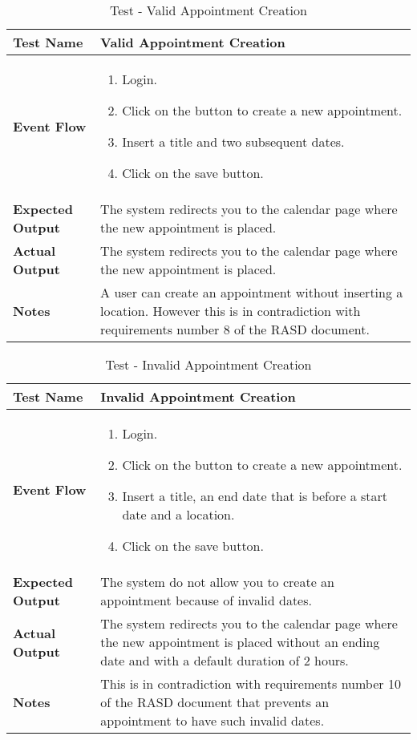 \begin{table}[h]	
\centering
\def\arraystretch{1.5}
\begin{tabular}{|m{7cm}|m{7cm}|}
	\hline
	\textbf{Test Name}            & Valid Appointment Creation   \\ \hline
	\textbf{Event Flow}             & 
	 	\begin{enumerate}
	 	\item Login.
	 	\item Click on the button to create a new appointment.
	 	\item Insert a title and two subsequent dates.
	 	\item Click on the save button.
	 \end{enumerate} \\ \hline
	\textbf{Expected Output}  &  The system redirects you to the calendar page where the new appointment is placed.   \\ \hline
	\textbf{Actual Output}       & The system redirects you to the calendar page where the new appointment is placed.    \\ \hline
	\textbf{Notes} & A user can create an appointment without inserting a location. However this is in contradiction with requirements number 8 of the RASD document. \\ \hline
\end{tabular}
\caption{Test - Valid Appointment Creation}
\end{table}


\begin{table}[h]	
	\centering
	\def\arraystretch{1.5}
	\begin{tabular}{|m{7cm}|m{7cm}|}
		\hline
		\textbf{Test Name}            & Invalid Appointment Creation   \\ \hline
		\textbf{Event Flow}             & 
		\begin{enumerate}
			\item Login.
			\item Click on the button to create a new appointment.
			\item Insert a title, an end date that is before a start date and a location.
			\item Click on the save button.
		\end{enumerate} \\ \hline
		\textbf{Expected Output}  &  The system do not allow you to create an appointment because of invalid dates.   \\ \hline
		\textbf{Actual Output}       & The system redirects you to the calendar page where the new appointment is placed without an ending date and with a default duration of 2 hours.    \\ \hline
		\textbf{Notes} & This is in contradiction with requirements number 10 of the RASD document that prevents an appointment to have such invalid dates. \\ \hline
	\end{tabular}
	\caption{Test - Invalid Appointment Creation}
\end{table}


